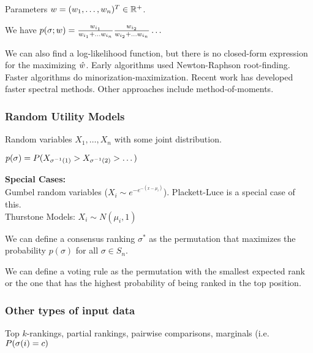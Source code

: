\documentclass[twoside]{article}
\begin{document}
Parameters $\boldmath{w} = (w_1,\dots,w_n)^T \in \mathbb{R}^+$.

We have $p(\sigma;\boldmath{w}) = \frac{w_{i_1}}{w_{i_1} + \dots w_{i_n}} \frac{w_{i_2}}{w_{i_2} + \dots w_{i_n}} \dots$

We can also find a log-likelihood function, but there is no closed-form expression for the maximizing $\boldmath{\hat{w}}$.  Early algorithms used Newton-Raphson root-finding.  Faster algorithms do minorization-maximization.  Recent work has developed faster spectral methods. Other approaches include method-of-moments.

\subsubsection*{Random Utility Models}

Random variables $X_1,\dots,X_n$ with some joint distribution.

$p(\sigma) = \boldmath{P}(X_{\sigma^{-1}(1)} > X_{\sigma^{-1}(2)} > \dots)$


\textbf{Special Cases:} \\
Gumbel random variables ($X_i \sim e^{-e^{-(x-\mu_i)}}$).  Plackett-Luce is a special case of this.\\
Thurstone Models: $X_i \sim N(\mu_i,1)$




We can define a consensus ranking $\sigma^*$ as the permutation that maximizes the probability $p(\sigma)$ for all $\sigma\in S_n$.

We can define a voting rule as the permutation with the smallest expected rank or the one that has the highest probability of being ranked in the top position.

\subsubsection{Other types of input data}

Top $k$-rankings, partial rankings, pairwise comparisons, marginals (i.e. $\boldmath{P}(\sigma(i) = c)$
\end{document}
